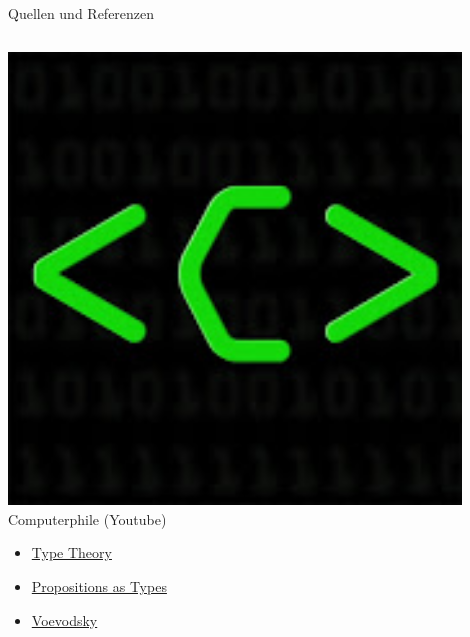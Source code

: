 \documentclass[11pt,aspectratio=169,notheorems]{beamer}
\begin{document}
\begin{frame}{Quellen und Referenzen}
\begin{columns}[T]
\begin{column}{.30\textwidth}
\begin{center}
            \includegraphics[width=0.9\textwidth]{images/computerphile}\\[2pt]
            Computerphile (Youtube)
            \tiny{
            \begin{itemize}
                \item \href{https://www.youtube.com/watch?v=qT8NyyRgLDQ}{Type Theory}
                
                \item \href{https://www.youtube.com/watch?v=SknxggwRPzU}{Propositions as Types}
                
                \item \href{https://www.youtube.com/watch?v=v5a5BYZwRx8}{Voevodsky}
                

\end{itemize}}
\end{center}
\end{column}
\end{columns}
\end{frame}
\end{document}

